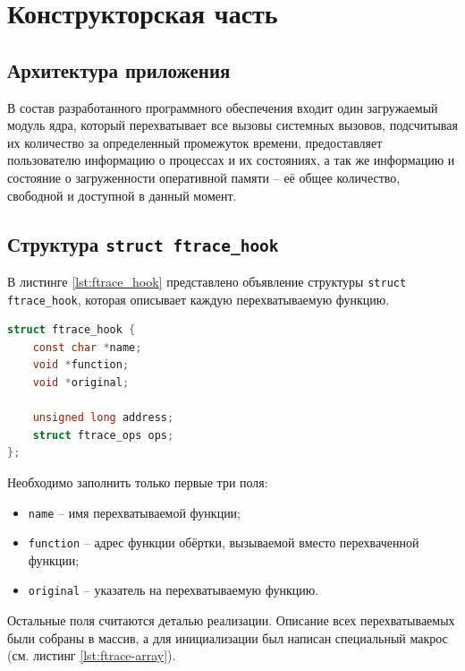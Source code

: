 \chapter{Конструкторская часть}

\section{Архитектура приложения}

В состав разработанного программного обеспечения входит один загружаемый модуль ядра, который перехватывает все вызовы системных вызовов, подсчитывая их количество за определенный промежуток времени, предоставляет пользователю информацию о процессах и их состояниях, а так же информацию и состояние о загруженности оперативной памяти -- её общее количество, свободной и доступной в данный момент.

\section{Структура \texttt{struct ftrace\_hook}}

В листинге \ref{lst:ftrace_hook} представлено объявление структуры \texttt{struct ftrace\_hook}, которая описывает каждую перехватываемую функцию.\\

\begin{lstlisting}[label=lst:ftrace_hook, caption=Листинг структуры ftrace\_hook, language=c]
struct ftrace_hook {
	const char *name;
	void *function;
	void *original;
	
	unsigned long address;
	struct ftrace_ops ops;
};
\end{lstlisting}

Необходимо заполнить только первые три поля:

\begin{itemize}
	\item \texttt{name} -- имя перехватываемой функции;
	\item \texttt{function} -- адрес функции обёртки, вызываемой вместо перехваченной функции;
	\item \texttt{original} -- указатель на перехватываемую функцию.
\end{itemize}

Остальные поля считаются деталью реализации. Описание всех перехватываемых были собраны в массив, а для инициализации был написан специальный макрос (см. листинг \ref{lst:ftrace-array}).\\

